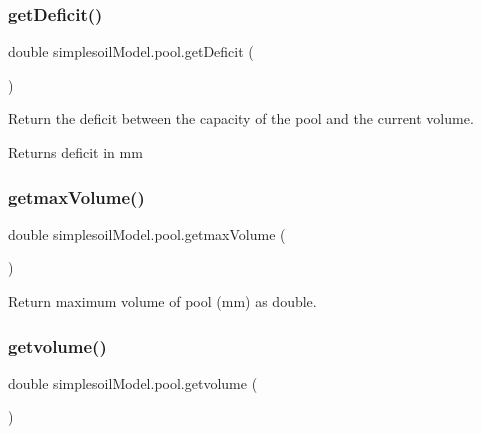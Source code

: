 \subsubsection{\texorpdfstring{getDeficit()}{getDeficit()}}
{\footnotesize\ttfamily double simplesoil\+Model.\+pool.\+get\+Deficit (\begin{DoxyParamCaption}{ }\end{DoxyParamCaption})\hspace{0.3cm}{\ttfamily [inline]}}



Return the deficit between the capacity of the pool and the current volume. 

\begin{DoxyReturn}{Returns}
deficit in mm 
\end{DoxyReturn}
\mbox{\label{classsimplesoil_model_1_1pool_ae038949bd94e78acf1fca1e82e6eae30}} 
\subsubsection{\texorpdfstring{getmaxVolume()}{getmaxVolume()}}
{\footnotesize\ttfamily double simplesoil\+Model.\+pool.\+getmax\+Volume (\begin{DoxyParamCaption}{ }\end{DoxyParamCaption})\hspace{0.3cm}{\ttfamily [inline]}}



Return maximum volume of pool (mm) as double. 

\mbox{\label{classsimplesoil_model_1_1pool_a29dc8988f752b7b7e1189d2442a431bd}} 
\subsubsection{\texorpdfstring{getvolume()}{getvolume()}}
{\footnotesize\ttfamily double simplesoil\+Model.\+pool.\+getvolume (\begin{DoxyParamCaption}{ }\end{DoxyParamCaption})\hspace{0.3cm}{\ttfamily [inline]}}



